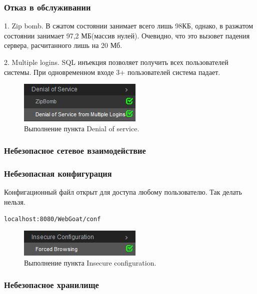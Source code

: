 \documentclass[10pt,a4paper]{article}
\begin{document}
\subsubsection{Отказ в обслуживании}

1. Zip bomb. В сжатом состоянии занимает всего лишь 98КБ, однако, в разжатом состоянии занимает 97,2 МБ(массив нулей). Очевидно, что это вызовет падения сервера, расчитанного лишь на 20 Мб.

2. Multiple logins. SQL инъекция позволяет получить всех пользователей системы. При одновременном входе 3+ пользователей система падает.

\begin{figure}[h!]
\centering
\includegraphics[scale=0.7]{10.jpg}
\caption{Выполнение пункта Denial of service.}
\end{figure}

\subsubsection{Небезопасное сетевое взаимодействие}

\subsubsection{Небезопасная конфигурация}

Конфигационный файл открыт для доступа любому пользователю. Так делать нельзя.

\begin{verbatim}
localhost:8080/WebGoat/conf
\end{verbatim}

\begin{figure}[h!]
\centering
\includegraphics[scale=0.7]{12.jpg}
\caption{Выполнение пункта Insecure configuration.}
\end{figure}

\subsubsection{Небезопасное хранилище}
\end{document}
